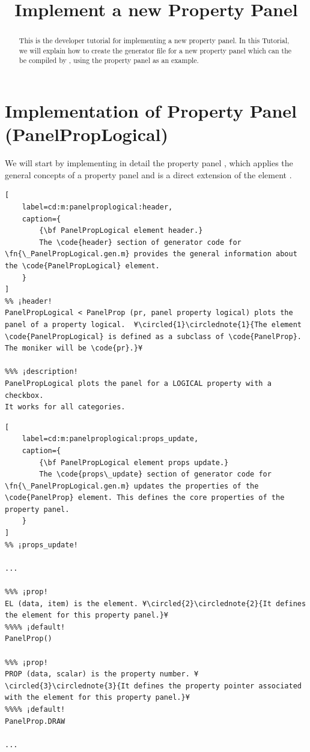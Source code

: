 \documentclass{tufte-handout}
\title{Implement a new Property Panel}
\begin{document}
\maketitle

\begin{abstract}
\noindent
This is the developer tutorial for implementing a new property panel. 
In this Tutorial, we will explain how to create the generator file  for a new property panel which can the be compiled by , using the property panel  as an example.
\end{abstract}

\tableofcontents

\clearpage
\section{Implementation of Property Panel (PanelPropLogical)}


We will start by implementing in detail the property panel , which applies the general concepts of a property panel and is a direct extension of the element .

\begin{lstlisting}[
	label=cd:m:panelproplogical:header,
	caption={
		{\bf PanelPropLogical element header.}
		The \code{header} section of generator code for \fn{\_PanelPropLogical.gen.m} provides the general information about the \code{PanelPropLogical} element.
	}
]
%% ¡header!
PanelPropLogical < PanelProp (pr, panel property logical) plots the panel of a property logical.  ¥\circled{1}\circlednote{1}{The element \code{PanelPropLogical} is defined as a subclass of \code{PanelProp}. The moniker will be \code{pr}.}¥

%%% ¡description!
PanelPropLogical plots the panel for a LOGICAL property with a checkbox.
It works for all categories.

\end{lstlisting}

\begin{lstlisting}[
	label=cd:m:panelproplogical:props_update,
	caption={
		{\bf PanelPropLogical element props update.}
		The \code{props\_update} section of generator code for \fn{\_PanelPropLogical.gen.m} updates the properties of the \code{PanelProp} element. This defines the core properties of the property panel.
	}
]
%% ¡props_update!

...

%%% ¡prop!
EL (data, item) is the element. ¥\circled{2}\circlednote{2}{It defines the element for this property panel.}¥
%%%% ¡default!
PanelProp()

%%% ¡prop!
PROP (data, scalar) is the property number. ¥\circled{3}\circlednote{3}{It defines the property pointer associated with the element for this property panel.}¥
%%%% ¡default!
PanelProp.DRAW

...

\end{lstlisting}
\end{document}
